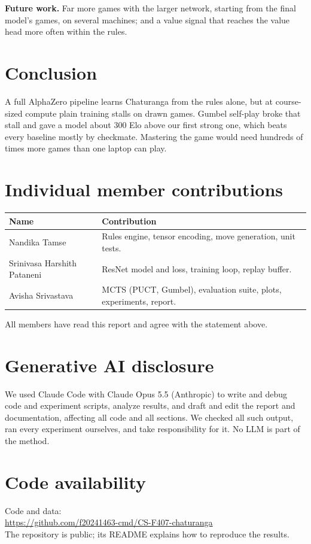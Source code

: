 \documentclass[11pt,a4paper,twocolumn]{article}
\newcommand{\githuburl}{https://github.com/f20241463-cmd/CS-F407-chaturanga}
\begin{document}
\textbf{Future work.} Far more games with the larger network, starting from the final
model's games, on several machines; and a value signal that reaches the value head more
often within the rules.

\section{Conclusion}
A full AlphaZero pipeline learns Chaturanga from the rules alone, but at course-sized
compute plain training stalls on drawn games. Gumbel self-play broke that stall and gave a
model about 300 Elo above our first strong one, which beats every baseline mostly by
checkmate. Mastering the game would need hundreds of times more games than one laptop can
play.

\section*{Individual member contributions}
{\small
\begin{tabularx}{\linewidth}{@{}>{\raggedright\arraybackslash}p{3.1cm} >{\raggedright\arraybackslash}X@{}}
\toprule
Name & Contribution \\
\midrule
Nandika Tamse & Rules engine, tensor encoding, move generation, unit tests. \\
Srinivasa Harshith Pataneni & ResNet model and loss, training loop, replay buffer. \\
Avisha Srivastava & MCTS (PUCT, Gumbel), evaluation suite, plots, experiments, report. \\
\bottomrule
\end{tabularx}}

\smallskip
\noindent All members have read this report and agree with the statement above.

\section*{Generative AI disclosure}
We used Claude Code with Claude Opus 5.5 (Anthropic) to write and debug code and experiment
scripts, analyze results, and draft and edit the report and documentation, affecting all code
and all sections. We checked all such output, ran every experiment ourselves, and take
responsibility for it. No LLM is part of the method.

\section*{Code availability}
\noindent Code and data:\\
\url{\githuburl}\\
The repository is public; its README explains how to reproduce the results.
\end{document}
